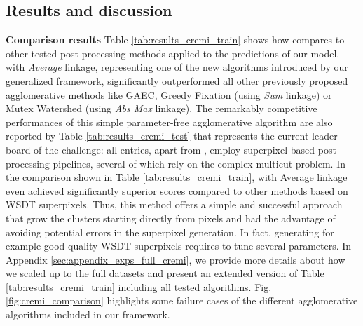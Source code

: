 

\subsection{Results and discussion}\label{sec:results}
\textbf{Comparison results } Table \ref{tab:results_cremi_train} shows how \algname{} compares to other tested post-processing methods applied to the predictions of our model. 
\algname{} with \emph{Average} linkage, representing one of the new algorithms introduced by our generalized framework, significantly outperformed all other previously proposed agglomerative methods like GAEC, Greedy Fixation (using \emph{Sum} linkage) or Mutex Watershed (using \emph{Abs Max} linkage). The remarkably competitive performances of this simple parameter-free agglomerative algorithm are also reported by Table \ref{tab:results_cremi_test} that represents the current leader-board of the challenge: all entries, apart from \algname{}, employ superpixel-based post-processing pipelines, several of which rely on the complex multicut problem. 
In the comparison shown in Table \ref{tab:results_cremi_train}, \algname{} with Average linkage even achieved significantly superior scores compared to other methods based on WSDT superpixels.
Thus, this method offers a simple and successful approach that grow the clusters starting directly from pixels and had the advantage of avoiding potential errors in the superpixel generation. In fact, generating for example good quality WSDT superpixels requires to tune several parameters.   
In Appendix \ref{sec:appendix_exps_full_cremi}, we provide more details about how we scaled up \algname{} to the full datasets and present an extended version of Table \ref{tab:results_cremi_train} including all tested \algname{} algorithms.
Fig. \ref{fig:cremi_comparison} highlights some failure cases of the different agglomerative algorithms included in our framework.

